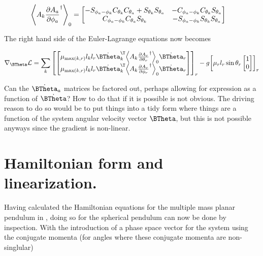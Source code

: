 \begin{align}\label{eqn:multiPendulumSpherical2:boo50}
\gpgradezero{ A_k \PD{\phi_a}{A_a}^\dagger }
&=
\begin{bmatrix}
-S_{\phi_a - \phi_k} C_{\theta_k} C_{\theta_a} + S_{\theta_k} S_{\theta_a} &
-C_{\phi_a - \phi_k} C_{\theta_k} S_{\theta_a} \\
C_{\phi_a - \phi_k} C_{\theta_a} S_{\theta_k} &
-S_{\phi_a - \phi_k} S_{\theta_k} S_{\theta_a} 
\end{bmatrix}
\end{align}

The right hand side of the Euler-Lagrange equations now becomes

\begin{align}\label{eqn:multiPendulumSpherical2:boo55}
\grad_{\BTheta} \LL =
\sum_k
{\begin{bmatrix}
\begin{bmatrix}
\mu_{\max(k,r)} l_k l_r {\dot{\BTheta}_k}^\T \gpgradezero{ A_k \PD{\theta_r}{A_r}^\dagger } \dot{\BTheta}_r \\
\mu_{\max(k,r)} l_k l_r {\dot{\BTheta}_k}^\T \gpgradezero{ A_k \PD{\phi_r}{A_r}^\dagger } \dot{\BTheta}_r 
\end{bmatrix}
\end{bmatrix}}_r
- g
{\begin{bmatrix}
\mu_r l_r \sin\theta_r 
\begin{bmatrix}
1 \\
0
\end{bmatrix}
\end{bmatrix}}_r
\end{align}

Can the $\dot{\BTheta}_a$ matrices be factored out, perhaps allowing for expression as a function of $\dot{\BTheta}$?  How to do that if it is possible is not obvious.  The driving reason to do so would be to put things into a tidy form where things are a function of the system angular velocity vector $\BTheta$, but this is not possible anyways since the gradient is non-linear.

\section{Hamiltonian form and linearization.}

Having calculated the Hamiltonian equations for the multiple mass planar pendulum in \cite{hamiltonian}, doing so for the spherical pendulum can now be done by inspection.  With the introduction of a phase space vector for the system using the conjugate momenta (for angles where these conjugate momenta are non-singlular)

